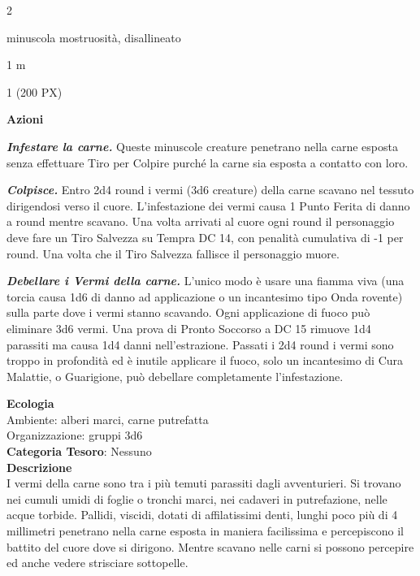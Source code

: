 \begin{multicols}{2}
{
\begin{description}[noitemsep, topsep=0pt, parsep=0pt, partopsep=0pt, itemsep=1pt, leftmargin=2.35cm,  labelwidth=2.2cm, itemindent=0cm, listparindent=0pt] %
\setlength{\baselineskip}{10pt}
\item[\textbf{Taglia/Tipo}] minuscola mostruosità, disallineato
\item[\textbf{Caratt.}] 
\item[\textbf{Punti Ferita}] 
\item[\textbf{Movimento}] 1 m
\item[\textbf{Tiri Salvez.}] 
\item[\textbf{Sensi}] 
\item[\textbf{Sfida}] 1 (200 PX)
\end{description}
\smallskip

\textbf{Azioni}

\emph{\textbf{Infestare la carne.}} Queste minuscole creature penetrano nella carne esposta senza effettuare Tiro per Colpire purché la carne sia esposta a contatto con loro.

\emph{\textbf{Colpisce.}} Entro 2d4 round i vermi (3d6 creature) della carne scavano nel tessuto dirigendosi verso il cuore. L'infestazione dei vermi causa 1 Punto Ferita di danno a round mentre scavano. Una volta arrivati al cuore ogni round il personaggio deve fare un Tiro Salvezza su Tempra DC 14, con penalità cumulativa di -1 per round. Una volta che il Tiro Salvezza fallisce il personaggio muore.

\emph{\textbf{Debellare i Vermi della carne.}} L'unico modo è usare una fiamma viva (una torcia causa 1d6 di danno ad applicazione o un incantesimo tipo Onda rovente) sulla parte dove i vermi stanno scavando. Ogni applicazione di fuoco può eliminare 3d6 vermi. Una prova di Pronto Soccorso a DC 15 rimuove 1d4 parassiti ma causa 1d4 danni nell'estrazione. Passati i 2d4 round i vermi sono troppo in profondità ed è inutile applicare il fuoco, solo un incantesimo di Cura Malattie, o Guarigione, può debellare completamente l'infestazione.

\textbf{Ecologia}\\
Ambiente: alberi marci, carne putrefatta\\
Organizzazione: gruppi 3d6\\
\textbf{Categoria Tesoro}: Nessuno\\
\textbf{Descrizione}\\
I vermi della carne sono tra i più temuti parassiti dagli avventurieri. Si trovano nei cumuli umidi di foglie o tronchi marci, nei cadaveri in putrefazione, nelle acque torbide. Pallidi, viscidi, dotati di affilatissimi denti, lunghi poco più di 4 millimetri penetrano nella carne esposta in maniera facilissima e percepiscono il battito del cuore dove si dirigono. Mentre scavano nelle carni si possono percepire ed anche vedere strisciare sottopelle.

}
\end{multicols}
